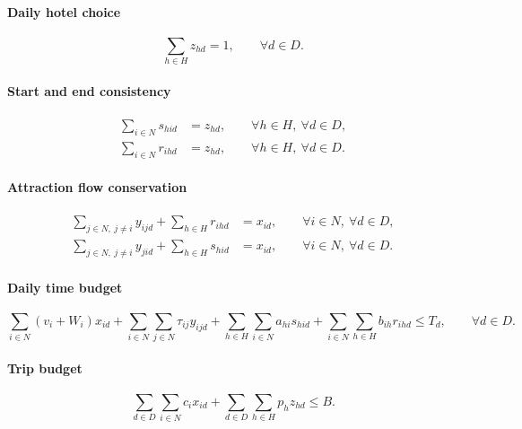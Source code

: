 \documentclass[12pt,a4paper]{article}
\begin{document}
\paragraph{Daily hotel choice}
\begin{equation}
\sum_{h \in H} z_{hd} = 1, \qquad \forall d \in D.
\label{eq:onehotel}
\end{equation}

\paragraph{Start and end consistency}
\begin{align}
\sum_{i \in N} s_{hid} &= z_{hd}, \qquad \forall h \in H,\ \forall d \in D, \label{eq:start_hotel}\\
\sum_{i \in N} r_{ihd} &= z_{hd}, \qquad \forall h \in H,\ \forall d \in D. \label{eq:end_hotel}
\end{align}

\paragraph{Attraction flow conservation}
\begin{align}
\sum_{j \in N,\ j\neq i} y_{ijd} + \sum_{h \in H} r_{ihd} &= x_{id}, \qquad \forall i \in N,\ \forall d \in D, \label{eq:flow_out}\\
\sum_{j \in N,\ j\neq i} y_{jid} + \sum_{h \in H} s_{hid} &= x_{id}, \qquad \forall i \in N,\ \forall d \in D. \label{eq:flow_in}
\end{align}

\paragraph{Daily time budget}
\begin{equation}
\sum_{i \in N} (v_i + W_i)x_{id}
+
\sum_{i \in N}\sum_{j \in N} \tau_{ij} y_{ijd}
+
\sum_{h \in H}\sum_{i \in N} a_{hi}s_{hid}
+
\sum_{i \in N}\sum_{h \in H} b_{ih}r_{ihd}
\le T_d,
\qquad \forall d \in D.
\label{eq:time_day}
\end{equation}

\paragraph{Trip budget}
\begin{equation}
\sum_{d \in D}\sum_{i \in N} c_i x_{id}
+
\sum_{d \in D}\sum_{h \in H} p_h z_{hd}
\le B.
\label{eq:budget_trip}
\end{equation}
\end{document}
